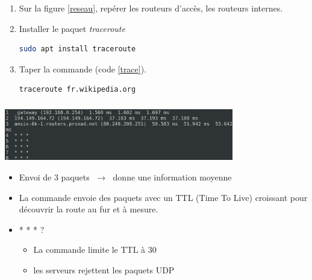 \documentclass[svgnames,11pt]{beamer}
\begin{document}
\begin{frame}[fragile]
    \frametitle{}

    \begin{activite}
        \begin{enumerate}
            \item Sur la figure \ref{reseau}, repérer les routeurs d'accès, les routeurs internes.
            \item Installer le paquet \emph{traceroute}
            \begin{center}
                \begin{lstlisting}[language=bash]
sudo apt install traceroute
                \end{lstlisting}
                \label{ip}
            \end{center}
            \item Taper la commande (code \ref{trace}).
            \begin{center}
                \begin{lstlisting}[language=bash]
traceroute fr.wikipedia.org
                \end{lstlisting}
                \label{trace}
            \end{center}
        \end{enumerate}
        \end{activite}

\end{frame}
\begin{frame}
    \frametitle{}

    \begin{center}
        \centering
        \includegraphics[width=10cm]{ressources/trace.png}
        \label{IMG}
    \end{center}
\begin{itemize}
    \item Envoi de 3 paquets $\;\rightarrow\;$ donne une information moyenne
    \item La commande envoie des paquets avec un TTL (Time To Live) croissant pour découvrir la route au fur et à mesure.
    \item * * * ?
    \begin{itemize}
        \item La commande limite le TTL à 30
        \item les serveurs rejettent les paquets UDP
    \end{itemize} 

\end{itemize}
\end{frame}
\end{document}

